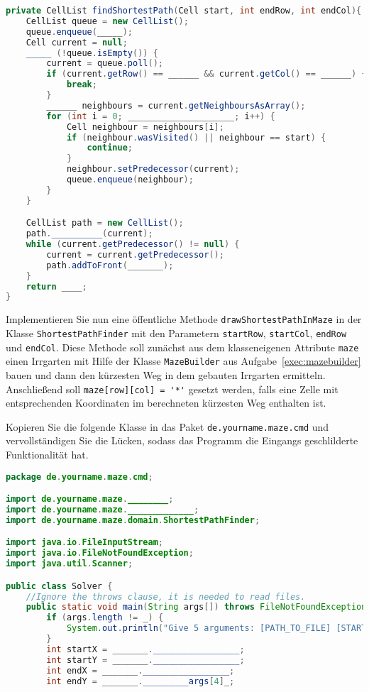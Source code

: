 \documentclass{exam}
\begin{document}
\begin{questions}
\begin{lstlisting}[language=java]
private CellList findShortestPath(Cell start, int endRow, int endCol){
    CellList queue = new CellList();
    queue.enqueue(_____);
    Cell current = null;
    _____ (!queue.isEmpty()) {
    	current = queue.poll();
        if (current.getRow() == ______ && current.getCol() == ______) {
        	break;
        }
        ______ neighbours = current.getNeighboursAsArray();
        for (int i = 0; _____________________; i++) {
        	Cell neighbour = neighbours[i];
            if (neighbour.wasVisited() || neighbour == start) {
            	continue;
            }
            neighbour.setPredecessor(current);
            queue.enqueue(neighbour);
        }
    }

    CellList path = new CellList();
    path.__________(current);
    while (current.getPredecessor() != null) {
    	current = current.getPredecessor();
        path.addToFront(_______);
    }
    return ____;
}
\end{lstlisting}


Implementieren Sie nun eine öffentliche Methode \verb|drawShortestPathInMaze| in der Klasse \verb|ShortestPathFinder| mit den Parametern \verb|startRow|, \verb|startCol|, \verb|endRow| und \verb|endCol|. Diese Methode soll zunächst aus dem klasseneigenen Attribute \verb|maze| einen Irrgarten mit Hilfe der Klasse \verb|MazeBuilder| aus Aufgabe~\ref{exec:mazebuilder} bauen und dann den kürzesten Weg in dem gebauten Irrgarten ermitteln. Anschließend soll \verb|maze[row][col] = '*'| gesetzt werden, falls eine Zelle mit entsprechenden Koordinaten im berechneten kürzesten Weg enthalten ist.
\newpage
{}

Kopieren Sie die folgende Klasse in das Paket \verb|de.yourname.maze.cmd| und vervollständigen Sie die Lücken, sodass das Programm die Eingangs geschlilderte Funktionalität hat.

\begin{lstlisting}[language=java]
package de.yourname.maze.cmd;

import de.yourname.maze.________;
import de.yourname.maze._____________;
import de.yourname.maze.domain.ShortestPathFinder;

import java.io.FileInputStream;
import java.io.FileNotFoundException;
import java.util.Scanner;

public class Solver {
    //Ignore the throws clause, it is needed to read files.
    public static void main(String args[]) throws FileNotFoundException {
        if (args.length != _) {
            System.out.println("Give 5 arguments: [PATH_TO_FILE] [START_ROW] [START_COL] [END_ROW] [END_COL]");
        }
        int startX = _______._________________;
        int startY = _______._________________;
        int endX = _______._________________;
        int endY = _______._________args[4]_;


\end{lstlisting}
\end{questions}
\end{document}
